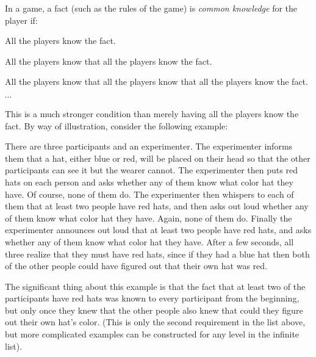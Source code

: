 \documentclass[12pt]{article}
\begin{document}
In a game, a fact (such as the rules of the game) is \emph{common knowledge} for the player if:
\begin{list}{}{}
\item All the players know the fact.
\item All the players know that all the players know the fact.
\item All the players know that all the players know that all the players know the fact.
\item $\cdots$
\end{list}{}{}
This is a much stronger condition than merely having all the players know the fact.  By way of illustration, consider the following example:

There are three participants and an experimenter.  The experimenter informs them that a hat, either blue or red, will be placed on their head so that the other participants can see it but the wearer cannot.  The experimenter then puts red hats on each person and asks whether any of them know what color hat they have.  Of course, none of them do.  The experimenter then whispers to each of them that at least two people have red hats, and then asks out loud whether any of them know what color hat they have.  Again, none of them do.  Finally the experimenter announces out loud that at least two people have red hats, and asks whether any of them know what color hat they have.  After a few seconds, all three realize that they must have red hats, since if they had a blue hat then both of the other people could have figured out that their own hat was red.

The significant thing about this example is that the fact that at least two of the participants have red hats was known to every participant from the beginning, but only once they knew that the other people also knew that could they figure out their own hat's color.  (This is only the second requirement in the list above, but more complicated examples can be constructed for any level in the infinite list).
\end{document}
